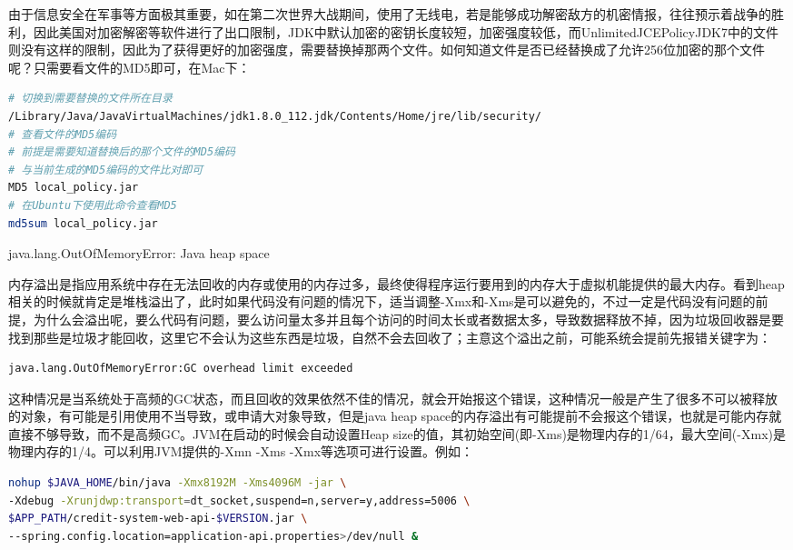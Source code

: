 \documentclass[12pt]{book}
\makeatletter
\numberwithin{dummy}{section}
\theoremstyle{ocrenumbox}
\theoremstyle{blacknumex}
\theoremstyle{blacknumbox}
\theoremstyle{ocrenum}
\renewcommand{\subsection}{\@startsection {subsection}{2}{\z@}
	{-3ex \@plus -0.1ex \@minus -.4ex}
	{0.5ex \@plus.2ex }
	{\normalfont\sffamily\bfseries}}
\makeatother
\begin{document}
由于信息安全在军事等方面极其重要，如在第二次世界大战期间，使用了无线电，若是能够成功解密敌方的机密情报，往往预示着战争的胜利，因此美国对加密解密等软件进行了出口限制，JDK中默认加密的密钥长度较短，加密强度较低，而UnlimitedJCEPolicyJDK7中的文件则没有这样的限制，因此为了获得更好的加密强度，需要替换掉那两个文件。如何知道文件是否已经替换成了允许256位加密的那个文件呢？只需要看文件的MD5即可，在Mac下：

\begin{lstlisting}[language=Bash]
# 切换到需要替换的文件所在目录
/Library/Java/JavaVirtualMachines/jdk1.8.0_112.jdk/Contents/Home/jre/lib/security/
# 查看文件的MD5编码
# 前提是需要知道替换后的那个文件的MD5编码
# 与当前生成的MD5编码的文件比对即可
MD5 local_policy.jar
# 在Ubuntu下使用此命令查看MD5
md5sum local_policy.jar
\end{lstlisting}

\subsection{java.lang.OutOfMemoryError: Java heap space	}

内存溢出是指应用系统中存在无法回收的内存或使用的内存过多，最终使得程序运行要用到的内存大于虚拟机能提供的最大内存。看到heap相关的时候就肯定是堆栈溢出了，此时如果代码没有问题的情况下，适当调整-Xmx和-Xms是可以避免的，不过一定是代码没有问题的前提，为什么会溢出呢，要么代码有问题，要么访问量太多并且每个访问的时间太长或者数据太多，导致数据释放不掉，因为垃圾回收器是要找到那些是垃圾才能回收，这里它不会认为这些东西是垃圾，自然不会去回收了；主意这个溢出之前，可能系统会提前先报错关键字为：

\begin{lstlisting}
java.lang.OutOfMemoryError:GC overhead limit exceeded
\end{lstlisting}

这种情况是当系统处于高频的GC状态，而且回收的效果依然不佳的情况，就会开始报这个错误，这种情况一般是产生了很多不可以被释放的对象，有可能是引用使用不当导致，或申请大对象导致，但是java heap space的内存溢出有可能提前不会报这个错误，也就是可能内存就直接不够导致，而不是高频GC。JVM在启动的时候会自动设置Heap size的值，其初始空间(即-Xms)是物理内存的1/64，最大空间(-Xmx)是物理内存的1/4。可以利用JVM提供的-Xmn -Xms -Xmx等选项可进行设置。例如：

\begin{lstlisting}[language=Bash]
nohup $JAVA_HOME/bin/java -Xmx8192M -Xms4096M -jar \
-Xdebug -Xrunjdwp:transport=dt_socket,suspend=n,server=y,address=5006 \
$APP_PATH/credit-system-web-api-$VERSION.jar \
--spring.config.location=application-api.properties>/dev/null &
\end{lstlisting}
\end{document}
